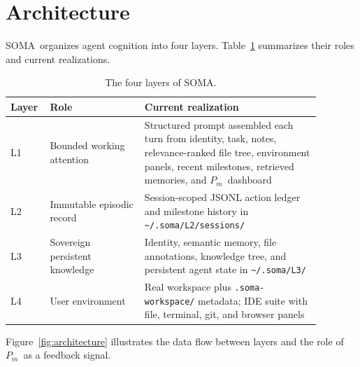 \documentclass[11pt,a4paper]{article}
\newcommand{\soma}{\textsc{SOMA}}
\newcommand{\Pm}{\ensuremath{P_m}}
\begin{document}
\section{Architecture}

\soma\ organizes agent cognition into four layers.
Table~\ref{tab:layers} summarizes their roles and current realizations.

\begin{table}[h]
\centering
\begin{tabular}{>{\raggedright\arraybackslash}p{0.08\linewidth}
                >{\raggedright\arraybackslash}p{0.28\linewidth}
                >{\raggedright\arraybackslash}p{0.52\linewidth}}
\toprule
Layer & Role & Current realization \\
\midrule
L1 & Bounded working attention &
  Structured prompt assembled each turn from identity, task, notes,
  relevance-ranked file tree, environment panels, recent milestones,
  retrieved memories, and \Pm\ dashboard \\
L2 & Immutable episodic record &
  Session-scoped JSONL action ledger and milestone history
  in \texttt{\textasciitilde/.soma/L2/sessions/} \\
L3 & Sovereign persistent knowledge &
  Identity, semantic memory, file annotations, knowledge tree,
  and persistent agent state in \texttt{\textasciitilde/.soma/L3/} \\
L4 & User environment &
  Real workspace plus \texttt{.soma-workspace/} metadata;
  IDE suite with file, terminal, git, and browser panels \\
\bottomrule
\end{tabular}
\caption{The four layers of \soma.}
\label{tab:layers}
\end{table}

Figure~\ref{fig:architecture} illustrates the data flow between layers
and the role of \Pm\ as a feedback signal.
\end{document}
